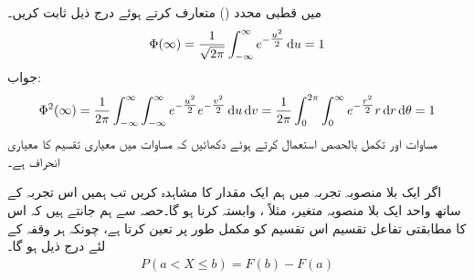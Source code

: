 \quad
{} میں قطبی محدد () متعارف کرتے ہوئے درج ذیل ثابت کریں۔
\begin{align}\label{مساوات_شماریات_سوال_مساوات}
\Phi(\infty)=\frac{1}{\sqrt{2\pi}}\int_{-\infty}^{\infty} e^{-\tfrac{u^2}{2}}\dif u=1
\end{align}
جواب:\quad
\begin{align*}
\Phi^2(\infty)=\frac{1}{2\pi}\int_{-\infty}^{\infty}\int_{-\infty}^{\infty}e^{-\tfrac{u^2}{2}}e^{-\tfrac{v^2}{2}}\dif u\dif v=\frac{1}{2\pi}\int_{0}^{2\pi}\int_{0}^{\infty} e^{-\tfrac{r^2}{2}}r\dif r \dif \theta=1
\end{align*}
\quad
مساوات  اور تکمل بالحصص استعمال کرتے ہوئے دکھائیں کہ مساوات  میں  معیاری تقسیم کا  معیاری انحراف ہے۔

اگر ایک بلا منصوبہ تجربہ میں ہم ایک مقدار کا مشاہدہ کریں تب ہمیں اس تجربہ کے ساتھ واحد ایک بلا منصوبہ متغیر، مثلاً ، وابستہ کرنا ہو گا۔حصہ  سے ہم جانتے ہیں کہ اس کا مطابقتی تفاعل تقسیم  اس تقسیم کو مکمل طور پر تعین کرتا ہے، چونکہ ہر وقفہ  کے لئے درج ذیل ہو گا۔
\begin{align*}
P(a<X\le b)=F(b)-F(a)
\end{align*}

